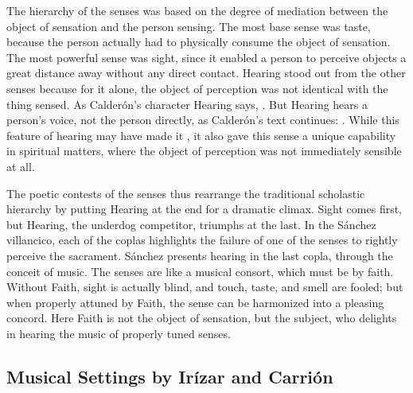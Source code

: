 The hierarchy of the senses was based on the degree of mediation between the object of sensation and the person sensing.
The most base sense was taste, because the person actually had to physically consume the object of sensation.
The most powerful sense was sight, since it enabled a person to perceive objects a great distance away without any direct contact.
Hearing stood out from the other senses because for it alone, the object of perception was not identical with the thing sensed.
As Calderón's character Hearing says, .%
  \autocite[]{Calderon:Retiro}
But Hearing hears a person's voice, not the person directly, as Calderón's text continues: .%
  \autocite[]{Calderon:Retiro}
While this feature of hearing may have made it , it also gave this sense a unique capability in spiritual matters, where the object of perception was not immediately sensible at all.

The poetic contests of the senses thus rearrange the traditional scholastic hierarchy by putting Hearing at the end for a dramatic climax.
Sight comes first, but Hearing, the underdog competitor, triumphs at the last.
In the Sánchez villancico, each of the coplas highlights the failure of one of the senses to rightly perceive the sacrament.
Sánchez presents hearing in the last copla, through the conceit of music.
The senses are  like a musical consort, which must be  by faith.
Without Faith, sight is actually blind, and touch, taste, and smell are fooled; but when properly attuned by Faith, the sense can be harmonized into a pleasing concord.
Here Faith is not the object of sensation, but the subject, who delights in hearing the music of properly tuned senses.

\subsection{Musical Settings by Irízar and Carrión}

